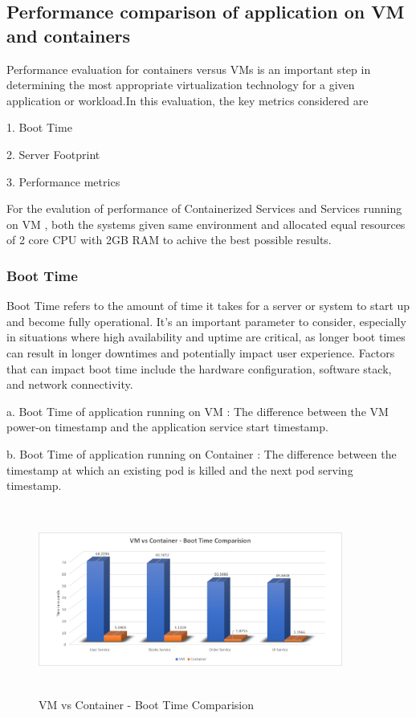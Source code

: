 \subsection{Performance comparison of application on VM and containers}
Performance evaluation for containers versus VMs is an important step in determining the most appropriate virtualization technology for a given application or workload.In this evaluation, the key metrics considered are

1. Boot Time 

2. Server Footprint

3. Performance metrics

For the evalution of performance of Containerized Services and Services running on VM , both the systems given same environment and allocated equal resources of 2 core CPU with 2GB RAM to achive the best possible results.


\subsubsection{Boot Time }
Boot Time refers to the amount of time it takes for a server or system to start up and become fully operational. It's an important parameter to consider, especially in situations where high availability and uptime are critical, as longer boot times can result in longer downtimes and potentially impact user experience. Factors that can impact boot time include the hardware configuration, software stack, and network connectivity.

a. Boot Time of application running on VM :  The difference between the VM power-on timestamp and the application service start timestamp.

b. Boot Time of application running on Container : The difference between the  timestamp at which an existing pod is killed and the next pod serving timestamp.

\begin{figure}[!h]
    \centering
    \includegraphics[width=10cm, height=6.2cm]{images/BootComp.png}
    \caption{VM vs Container - Boot Time Comparision}
\end{figure}

